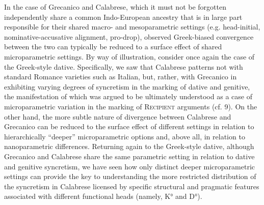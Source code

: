 \documentclass[output=paper,modfonts,nonflat]{langsci/langscibook}
\begin{document}
\begin{styleStandard}
In the case of Grecanico and Calabrese, which it must not be forgotten independently share a common Indo-European ancestry that is in large part responsible for their shared macro- and mesoparametric settings (e.g. head-initial, nominative-accusative alignment, pro-drop), observed Greek-biased convergence between the two can typically be reduced to a surface effect of shared microparametric settings. By way of illustration, consider once again the case of the Greek-style dative. Specifically, we saw that Calabrese patterns not with standard Romance varieties such as Italian, but, rather, with Grecanico in exhibiting varying degrees of syncretism in the marking of dative and genitive, the manifestation of which was argued to be ultimately understood as a case of microparametric variation in the marking of \textsc{Recipient} arguments (cf. 9). On the other hand, the more subtle nature of divergence between Calabrese and Grecanico can be reduced to the surface effect of different settings in relation to hierarchically “deeper” microparametric options and, above all, in relation to nanoparametric differences. Returning again to the Greek-style dative, although Grecanico and Calabrese share the same parametric setting in relation to dative and genitive syncretism, we have seen how only distinct deeper microparametric settings can provide the key to understanding the more restricted distribution of the syncretism in Calabrese licensed by specific structural and pragmatic features associated with different functional heads (namely, K° and D°).
\end{styleStandard}
\end{document}

